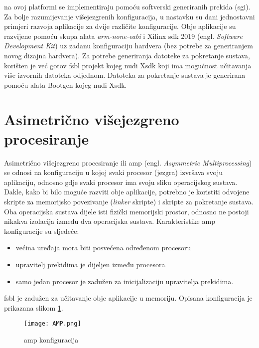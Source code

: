 \documentclass[times, utf8, diplomski, numeric]{fer}
\begin{document}
na ovoj platformi se implementiraju pomoću softverski generiranih prekida (\gls{sgi}). Za bolje razumijevanje
višejezgrenih konfiguracija, u nastavku su dani jednostavni primjeri razvoja aplikacije za dvije različite
konfiguracije. Obje aplikacije su razvijene pomoću skupa alata \textit{arm-none-eabi} i Xilinx \gls{sdk} 2019 (engl.
\textit{Software Development Kit}) uz zadanu konfiguraciju hardvera (bez potrebe za generiranjem
novog dizajna hardvera). Za potrebe generiranja datoteke za pokretanje sustava, korišten je već gotov \gls{fsbl} projekt
kojeg nudi X\gls{sdk} koji ima mogućnost učitavanja više izvornih datoteka odjednom. Datoteka za pokretanje sustava je
generirana pomoću alata Bootgen kojeg nudi X\gls{sdk}.

\section{Asimetrično višejezgreno procesiranje}
Asimetrično višejezgreno procesiranje ili \gls{amp} (engl. \textit{Asymmetric Multiprocessing}) se odnosi na
konfiguraciju u kojoj svaki procesor (jezgra) izvršava svoju aplikaciju, odnosno gdje svaki procesor ima
svoju sliku operacijskog sustava. Dakle, kako bi bilo moguće razviti obje aplikacije, potrebno je koristiti
odvojene skripte za memorijsko povezivanje (\textit{linker} skripte) i skripte za pokretanje sustava. Oba
operacijska sustava dijele isti fizički memorijski prostor, odnosno ne postoji nikakva izolacija između dva
operacijska sustava. Karakteristike \gls{amp} konfiguracije su sljedeće:
\begin{itemize}
  \item{većina uređaja mora biti posvećena određenom procesoru}
  \item{upravitelj prekidima je dijeljen između procesora}
  \item{samo jedan procesor je zadužen za inicijalizaciju upravitelja prekidima.}
\end{itemize}
\gls{fsbl} je zadužen za učitavanje obje aplikacije u memoriju. Opisana konfiguracija je prikazana slikom \ref{amp}.

\begin{figure}[H]
  \centering
	\texttt{[image: AMP.png]}%
	\caption{\gls{amp} konfiguracija}
	\label{amp}%
\end{figure}
\end{document}
